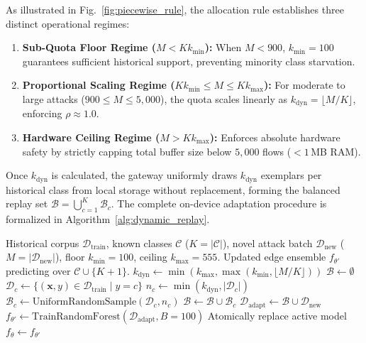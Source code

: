 \documentclass[conference]{IEEEtran}
\begin{document}
As illustrated in Fig.~\ref{fig:piecewise_rule}, the allocation rule establishes three distinct operational regimes:
\begin{enumerate}
    \item \textbf{Sub-Quota Floor Regime ($M < K k_{\min}$):} When $M < 900$, $k_{\min} = 100$ guarantees sufficient historical support, preventing minority class starvation.
    \item \textbf{Proportional Scaling Regime ($K k_{\min} \le M \le K k_{\max}$):} For moderate to large attacks ($900 \le M \le 5{,}000$), the quota scales linearly as $k_{\text{dyn}} = \lfloor M/K \rfloor$, enforcing $\rho \approx 1.0$.
    \item \textbf{Hardware Ceiling Regime ($M > K k_{\max}$):} Enforces absolute hardware safety by strictly capping total buffer size below $5{,}000$ flows ($<1$\,MB RAM).
\end{enumerate}

Once $k_{\text{dyn}}$ is calculated, the gateway uniformly draws $k_{\text{dyn}}$ exemplars per historical class from local storage without replacement, forming the balanced replay set $\mathcal{B} = \bigcup_{c=1}^{K} \mathcal{B}_c$. The complete on-device adaptation procedure is formalized in Algorithm~\ref{alg:dynamic_replay}.

\begin{algorithm}[htbp]
\caption{Dynamic Replay Continual Adaptation}
\label{alg:dynamic_replay}
\begin{algorithmic}[1]
\REQUIRE Historical corpus $\mathcal{D}_{\text{train}}$, known classes $\mathcal{C}$ ($K=|\mathcal{C}|$), novel attack batch $\mathcal{D}_{\text{new}}$ ($M=|\mathcal{D}_{\text{new}}|$), floor $k_{\min}=100$, ceiling $k_{\max}=555$.
\ENSURE Updated edge ensemble $f_{\theta'}$ predicting over $\mathcal{C} \cup \{K+1\}$.
\STATE $k_{\text{dyn}} \leftarrow \min\left(k_{\max}, \max\left(k_{\min}, \lfloor M / K \rfloor\right)\right)$
\STATE $\mathcal{B} \leftarrow \emptyset$
    \STATE $\mathcal{D}_c \leftarrow \{(\mathbf{x}, y) \in \mathcal{D}_{\text{train}} \mid y = c\}$
    \STATE $n_c \leftarrow \min(k_{\text{dyn}}, |\mathcal{D}_c|)$
    \STATE $\mathcal{B}_c \leftarrow \text{UniformRandomSample}(\mathcal{D}_c, n_c)$
    \STATE $\mathcal{B} \leftarrow \mathcal{B} \cup \mathcal{B}_c$
\ENDFOR
\STATE $\mathcal{D}_{\text{adapt}} \leftarrow \mathcal{B} \cup \mathcal{D}_{\text{new}}$
\STATE $f_{\theta'} \leftarrow \text{TrainRandomForest}(\mathcal{D}_{\text{adapt}}, B=100)$
\STATE Atomically replace active model $f_\theta \leftarrow f_{\theta'}$
\end{algorithmic}
\end{algorithm}
\end{document}
